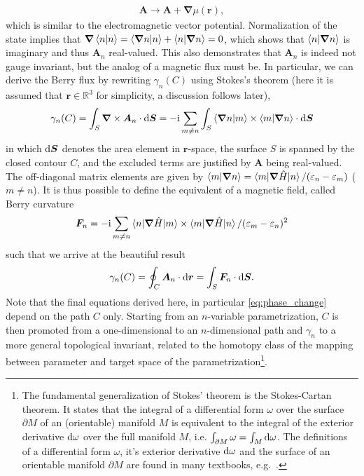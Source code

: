 \begin{align}
    \bm A \rightarrow {\bm A} + \bm\nabla\mu(\bm r),
\end{align}
which is similar to the electromagnetic vector potential.
Normalization of the state implies that $\bm\nabla \braket{n|n} = \braket{\bm\nabla n|n} + \braket{n|\bm\nabla n} = 0$, which shows that $\braket{n|\bm\nabla n}$ is imaginary and thus ${\bm A_n}$ real-valued.
This also demonstrates that $\bm A_n$ is indeed not gauge invariant, but the analog of a magnetic flux must be.
In particular, we can derive the Berry flux by rewriting $\gamma_n(C)$ using Stokes's theorem (here it is assumed that $\bm r\in\mathds R^3$ for simplicity, a discussion follows later),
\begin{align}
    \gamma_n(C) = \int_S{\bm\nabla}\times{\bm A_n}\cdot\mathrm d{\bm S} = -\mathrm i\sum_{m\neq n}\int_S\braket{\bm\nabla n|m}\times\braket{m|\bm\nabla n}\cdot \mathrm d{\bm S}
    \label{eq:berry_phase_stokes_theorem}
\end{align}
in which $\mathrm d{\bm S}$ denotes the area element in ${\bm r}$-space, the surface $S$ is spanned by the closed contour $C$, and the excluded terms are justified by $\bm A$ being real-valued.
The off-diagonal matrix elements are given by $\braket{m|{\bm\nabla} n} = \braket{m|\bm\nabla\hat H|n}/(\varepsilon_n-\varepsilon_m)$ ($m\neq n$).
It is thus possible to define the equivalent of a magnetic field, called Berry curvature
\begin{align}
    \bm F_n = -\mathrm i\sum_{m\neq n}\braket{n|\bm\nabla\hat H|m}\times\braket{m|\bm\nabla\hat H|n}/(\varepsilon_m-\varepsilon_n)^2
\end{align}
such that we arrive at the beautiful result
\begin{align}
    \gamma_n(C) = \oint_C{\bm A_n}\cdot\mathrm d \bm r = \int_S {\bm F_n}\cdot\mathrm d{\bm S}.
    \label{eq:berry_phase_stokes_theorem_2}
\end{align}
Note that the final equations derived here, in particular \cref{eq:phase_change} depend on the path $C$ only.
Starting from an $n$-variable parametrization, $C$ is then promoted from a one-dimensional to an $n$-dimensional path and $\gamma_n$ to a more general topological invariant, related to the homotopy class of the mapping between parameter and target space of the parametrization\footnote{
    The fundamental generalization of Stokes' theorem is the Stokes-Cartan theorem.
    It states that the integral of a differential form $\omega$ over the surface $\partial M$ of an (orientable) manifold $M$ is equivalent to the integral of the exterior derivative $\mathrm d\omega$ over the full manifold $M$, i.e. $\int_{\partial M}\omega = \int_M\mathrm d\omega$.
    The definitions of a differential form $\omega$, it's exterior derivative $\mathrm d\omega$ and the surface of an orientable manifold $\partial M$ are found in many textbooks, e.g.~\cite{Nakahara1990}.
}.

